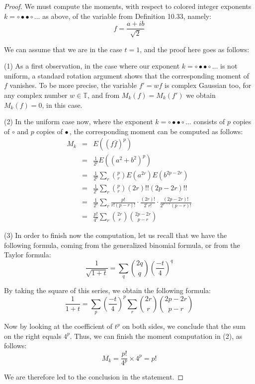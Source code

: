 \documentclass[12pt]{amsbook}
\begin{document}
\begin{proof}
We must compute the moments, with respect to colored integer exponents $k=\circ\bullet\bullet\circ\ldots$ as above, of the variable from Definition 10.33, namely:
$$f=\frac{a+ib}{\sqrt{2}}$$

We can assume that we are in the case $t=1$, and the proof here goes as follows:

\medskip

(1) As a first observation, in the case where our exponent $k=\circ\bullet\bullet\circ\ldots$ is not uniform, a standard rotation argument shows that the corresponding moment of $f$ vanishes. To be more precise, the variable $f'=wf$ is complex Gaussian too, for any complex number $w\in\mathbb T$, and from $M_k(f)=M_k(f')$ we obtain $M_k(f)=0$, in this case.

\medskip

(2) In the uniform case now, where the exponent $k=\circ\bullet\bullet\circ\ldots$ consists of $p$ copies of $\circ$ and $p$ copies of $\bullet$\,, the corresponding moment can be computed as follows:
\begin{eqnarray*}
M_k
&=&E\left((f\bar{f})^p\right)\\
&=&\frac{1}{2^p}E\left((a^2+b^2)^p\right)\\
&=&\frac{1}{2^p}\sum_r\binom{p}{r}E(a^{2r})E(b^{2p-2r})\\
&=&\frac{1}{2^p}\sum_r\binom{p}{r}(2r)!!(2p-2r)!!\\
&=&\frac{1}{2^p}\sum_r\frac{p!}{r!(p-r)!}\cdot\frac{(2r)!}{2^rr!}\cdot\frac{(2p-2r)!}{2^{p-r}(p-r)!}\\
&=&\frac{p!}{4^p}\sum_r\binom{2r}{r}\binom{2p-2r}{p-r}
\end{eqnarray*}

(3) In order to finish now the computation, let us recall that we have the following formula, coming from the generalized binomial formula, or from the Taylor formula:
$$\frac{1}{\sqrt{1+t}}=\sum_q\binom{2q}{q}\left(\frac{-t}{4}\right)^q$$

By taking the square of this series, we obtain the following formula:
$$\frac{1}{1+t}
=\sum_p\left(\frac{-t}{4}\right)^p\sum_r\binom{2r}{r}\binom{2p-2r}{p-r}$$

Now by looking at the coefficient of $t^p$ on both sides, we conclude that the sum on the right equals $4^p$. Thus, we can finish the moment computation in (2), as follows:
$$M_k=\frac{p!}{4^p}\times 4^p=p!$$

We are therefore led to the conclusion in the statement.
\end{proof}
\end{document}
